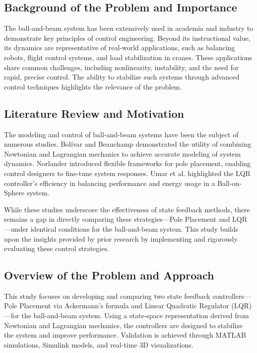 \documentclass[conference]{IEEEtran}
\begin{document}
\subsection{Background of the Problem and Importance}
\label{subsec:intro_background}
The ball-and-beam system has been extensively used in academia and industry to demonstrate key principles of control engineering. Beyond its instructional value, its dynamics are representative of real-world applications, such as balancing robots, flight control systems, and load stabilization in cranes. These applications share common challenges, including nonlinearity, instability, and the need for rapid, precise control. The ability to stabilize such systems through advanced control techniques highlights the relevance of the problem.

\subsection{Literature Review and Motivation}
\label{subsec:intro_lit_review}
The modeling and control of ball-and-beam systems have been the subject of numerous studies. Bolívar and Beauchamp \cite{bolivar2014} demonstrated the utility of combining Newtonian and Lagrangian mechanics to achieve accurate modeling of system dynamics. Norlander \cite{norlaner2003} introduced flexible frameworks for pole placement, enabling control designers to fine-tune system responses. Umar et al. \cite{umar2022} highlighted the LQR controller's efficiency in balancing performance and energy usage in a Ball-on-Sphere system.

While these studies underscore the effectiveness of state feedback methods, there remains a gap in directly comparing these strategies—Pole Placement and LQR—under identical conditions for the ball-and-beam system. This study builds upon the insights provided by prior research by implementing and rigorously evaluating these control strategies.

\subsection{Overview of the Problem and Approach}
\label{subsec:intro_overview}
This study focuses on developing and comparing two state feedback controllers—Pole Placement via Ackermann’s formula and Linear Quadratic Regulator (LQR)—for the ball-and-beam system. Using a state-space representation derived from Newtonian and Lagrangian mechanics, the controllers are designed to stabilize the system and improve performance. Validation is achieved through MATLAB simulations, Simulink models, and real-time 3D visualizations.
\end{document}
